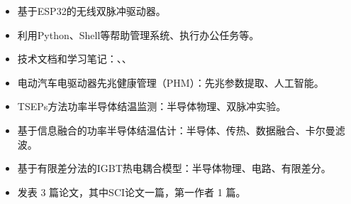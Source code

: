 \documentclass[zh]{resume}
\begin{document}
\begin{itemize}
  \item 基于ESP32的无线双脉冲驱动器。
  \item 利用Python、Shell等帮助管理系统、执行办公任务等。
  \item 技术文档和学习笔记：、、
\end{itemize}

\begin{itemize}
  \item 电动汽车电驱动器先兆健康管理（PHM）：先兆参数提取、人工智能。
  \item TSEPs方法功率半导体结温监测：半导体物理、双脉冲实验。
  \item 基于信息融合的功率半导体结温估计：半导体、传热、数据融合、卡尔曼滤波。
  \item 基于有限差分法的IGBT热电耦合模型：半导体物理、电路、有限差分。
  \item 发表 3 篇论文，其中SCI论文一篇，第一作者 1 篇。
\end{itemize}


\end{document}

